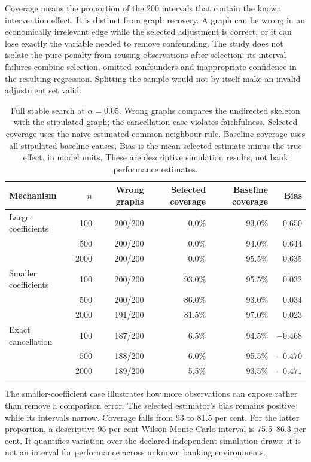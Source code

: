 Coverage means the proportion of the 200 intervals that contain the known
intervention effect. It is distinct from graph recovery. A graph can be wrong
in an economically irrelevant edge while the selected adjustment is correct,
or it can lose exactly the variable needed to remove confounding. The study
does not isolate the pure penalty from reusing observations after selection:
its interval failures combine selection, omitted confounders and inappropriate
confidence in the resulting regression. Splitting the sample would not by
itself make an invalid adjustment set valid.

\begin{table}[htbp]
\centering\small
\begin{tabular}{lrrrrr}
\toprule
Mechanism & $n$ & Wrong graphs & Selected coverage & Baseline coverage & Bias\\
\midrule
Larger coefficients &100&200/200&0.0\%&93.0\%&0.650\\
 &500&200/200&0.0\%&94.0\%&0.644\\
 &2000&200/200&0.0\%&95.5\%&0.635\\
Smaller coefficients &100&200/200&93.0\%&95.5\%&0.032\\
 &500&200/200&86.0\%&93.0\%&0.034\\
 &2000&191/200&81.5\%&97.0\%&0.023\\
Exact cancellation &100&187/200&6.5\%&94.5\%&$-0.468$\\
 &500&188/200&6.0\%&95.5\%&$-0.470$\\
 &2000&189/200&5.5\%&93.5\%&$-0.471$\\
\bottomrule
\end{tabular}
\caption{Full stable search at $\alpha=0.05$. Wrong graphs compares the
undirected skeleton with the stipulated graph; the cancellation case violates
faithfulness. Selected coverage uses the naive estimated-common-neighbour
rule. Baseline coverage uses all stipulated baseline causes. Bias is the
mean selected estimate minus the true effect, in model units. These are
descriptive simulation results, not bank performance estimates.}
\label{closure30:sampling-results}
\end{table}

The smaller-coefficient case illustrates how more observations can expose
rather than remove a comparison error. The selected estimator's bias remains
positive while its intervals narrow. Coverage falls from 93 to 81.5 per cent.
For the latter proportion, a descriptive 95 per cent Wilson Monte Carlo
interval is 75.5--86.3 per cent. It quantifies variation over the declared
independent simulation draws; it is not an interval for performance across
unknown banking environments.

